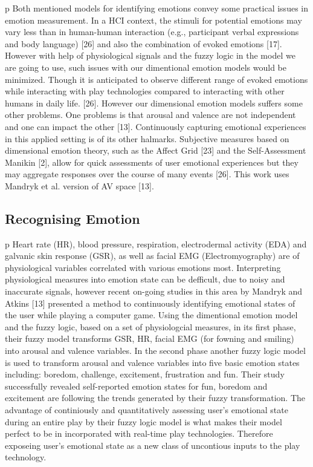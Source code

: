 \documentclass[conference]{include/IEEEtran}
\begin{document}
p Both mentioned models for identifying emotions convey some practical issues in emotion measurement. In a HCI context, the stimuli for potential emotions may vary less than in human-human interaction (e.g., participant verbal expressions and body language) [26] and also the combination of evoked emotions [17]. However with help of physiological signals and the fuzzy logic in the model we are going to use, such issues with our dimentional emotion models would be minimized. Though it is anticipated to observe different range of evoked emotions while interacting with play technologies compared to interacting with other humans in daily life. [26]. However our dimensional emotion models suffers some other problems. One problems is that arousal and valence are not independent and one can impact the other [13]. Continuously capturing emotional experiences in this applied setting is of its other halmarks. Subjective measures based on dimensional emotion theory, such as the Affect Grid [23] and the Self-Assessment Manikin [2], allow for quick assessments of user emotional experiences but they may aggregate responses over the course of many events [26]. This work uses Mandryk et al. version of AV space [13]. 

\subsection{Recognising Emotion}

p Heart rate (HR), blood pressure, respiration, electrodermal activity (EDA) and galvanic skin response (GSR), as well as facial EMG (Electromyography) are of physiological variables correlated with various emotions most. Interpreting physiological measures into emotion state can be defficult, due to noisy and inaccurate signals, however recent on-going studies in this area by Mandryk and Atkins [13] presented a method to continuously identifying emotional states of the user while playing a computer game. Using the dimentional emotion model and the fuzzy logic, based on a set of physiologcial measures, in its ﬁrst phase, their fuzzy model transforms GSR, HR, facial EMG (for fowning and smiling) into arousal and valence variables. In the second phase another fuzzy logic model is used to transform arousal and valence variables into ﬁve basic emotion states including: boredom, challenge, excitement, frustration and fun. Their study successfully revealed self-reported emotion states for fun, boredom and excitement are following the trends generated by their fuzzy transformation. The advantage of continiously and quantitatively assessing user’s emotional state during an entire play by their fuzzy logic model is what makes their model perfect to be in incorporated with real-time play technologies. Therefore exposeing user’s emotional state as a new class of uncontious inputs to the play technology. 
\end{document}
